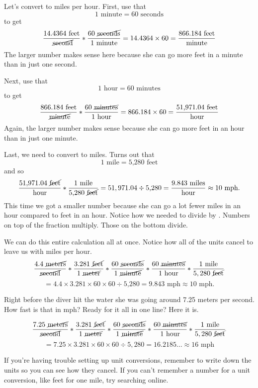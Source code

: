 Let's convert to miles per hour.  First, use that
$$1 \text{ minute} = 60 \text{ seconds}$$ to get
$$ \frac{14.4364  \text{ feet}}{\text{ \cancel{second}}} \ast \frac{60 \text{  \cancel{seconds}}}{1\text{ minute}} =  14.4364 \times 60 = \frac{866.184 \text{ feet}}{\text{minute}}$$ 
The larger number makes sense here because she can go more feet in a minute than in just one second.  

Next, use that
$$1 \text{ hour} = 60 \text{ minutes}$$ to get
$$ \frac{866.184 \text{ feet}}{\text{ \cancel{minute}}}\ast  \frac{60 \text{ \cancel{minutes}}}{1\text{ hour}} = 866.184 \times 60 = \frac{ \text{51,971.04 feet}}{\text{hour}}$$  
Again, the larger number makes sense because she can go more feet in an hour than in just one minute.  

Last, we need to convert to miles.  Turns out that 
$$1 \text{ mile} = \text{5,280 feet}$$ and so
$$ \frac{ \text{51,971.04 \cancel{feet}}}{\text{hour}}\ast  \frac{1 \text{ mile}}{\text{5,280 \cancel{feet}}} = 51,971.04 \div \text{5,280} = \frac{9.843 \text{ miles}}{\text{hour}} \approx 10 \text{ mph}.$$  
This time we got a smaller number because she can go a lot fewer miles in an hour compared to feet in an hour.  Notice how we needed to divide by .  Numbers on top of the fraction multiply. Those on the bottom divide.

We can do this entire calculation all at once.  Notice how all of the units cancel to leave us with miles per hour.  $$ \frac{4.4 \text{ \cancel{meters}}}{\text{\cancel{second}}} \ast \frac{3.281 \text{ \cancel{feet}}}{1 \text{ \cancel{meter}}}  \ast \frac{60 \text{ \cancel{seconds}}}{1 \text{ \cancel{minute}}}\ast  \frac{60 \text{ \cancel{minutes}}}{1\text{ hour}}\ast  \frac{1 \text{ mile}}{5,280\text{ \cancel{feet}}} $$
$$= 4.4 \times 3.281 \times 60 \times 60 \div \text{5,280} = 9.843 \text{ mph} \approx 10 \text{ mph}.$$  

Right before the diver hit the water she was going around 7.25 meters per second.  How fast is that in mph? Ready for it all in one line?  Here it is.

$$ \frac{7.25 \text{ \cancel{meters}}}{\text{\cancel{second}}} \ast \frac{3.281 \text{ \cancel{feet}}}{1 \text{ \cancel{meter}}}  \ast \frac{60 \text{ \cancel{seconds}}}{1 \text{ \cancel{minute}}}\ast  \frac{60 \text{ \cancel{minutes}}}{1\text{ hour}}\ast  \frac{1 \text{ mile}}{5,280\text{ \cancel{feet}}} $$
$$=7.25 \times 3.281 \times 60 \times 60 \div 5,280 = 16.2185\ldots \approx 16 \text{ mph}$$

If you're having trouble setting up unit conversions, remember to write down the units so you can see how they cancel.  If you can't remember a number for a unit conversion, like  feet for one mile, try searching online.

 
